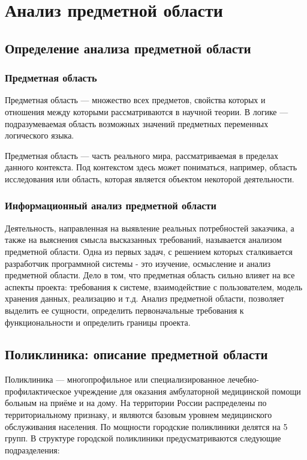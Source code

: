 \documentclass[14pt,a4paper,russian]{extreport}
\begin{document}

\tableofcontents{}

\newpage

\sloppy

\chapter{Анализ предметной области}

\section{Определение анализа предметной области}

\subsection{Предметная область}
Предметная область — множество всех предметов, свойства которых и отношения между которыми
рассматриваются в научной теории. В логике — подразумеваемая область возможных значений предметных
переменных логического языка.

Предметная область — часть реального мира, рассматриваемая в пределах данного контекста. Под
контекстом здесь может пониматься, например, область исследования или область, которая является
объектом некоторой деятельности.\cite{domainknowladge}

\subsection{Информационный анализ предметной области}
Деятельность, направленная на выявление реальных потребностей заказчика, а также на выяснения
смысла высказанных требований, называется анализом предметной области.
Одна из первых задач, с решением которых сталкивается разработчик программной системы - это
изучение, осмысление и анализ предметной области. Дело в том, что предметная область сильно влияет
на все аспекты проекта: требования к системе, взаимодействие с пользователем, модель хранения
данных, реализацию и т.д.  Анализ предметной области, позволяет выделить ее сущности, определить
первоначальные требования к функциональности и определить границы проекта.


\section{Поликлиника: описание предметной области}
Поликлиника — многопрофильное или специализированное лечебно-профилактическое учреждение для
оказания амбулаторной медицинской помощи больным на приёме и на дому.  На территории России
распределены по территориальному признаку, и являются базовым уровнем медицинского обслуживания
населения.  По мощности городские поликлиники делятся на 5 групп. В структуре городской поликлиники
предусматриваются следующие подразделения:
\end{document}
